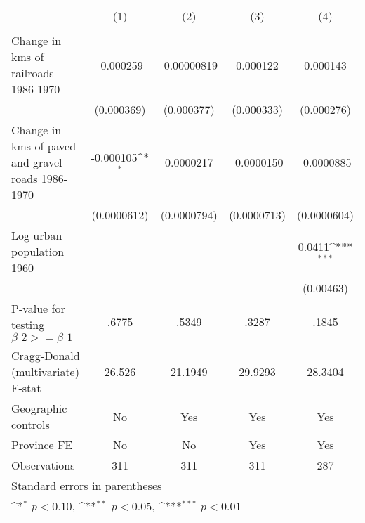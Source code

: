 {
\def\sym#1{\ifmmode^{#1}\else\(^{#1}\)\fi}
\begin{tabular}{l*{4}{c}}
\hline\hline
                &\multicolumn{1}{c}{(1)}&\multicolumn{1}{c}{(2)}&\multicolumn{1}{c}{(3)}&\multicolumn{1}{c}{(4)}\\
                &\multicolumn{1}{c}{}&\multicolumn{1}{c}{}&\multicolumn{1}{c}{}&\multicolumn{1}{c}{}\\
\hline
Change in kms of railroads 1986-1970&-0.000259         &-0.00000819         & 0.000122         & 0.000143         \\
                &(0.000369)         &(0.000377)         &(0.000333)         &(0.000276)         \\
[1em]
Change in kms of paved and gravel roads 1986-1970&-0.000105\sym{*}  &0.0000217         &-0.0000150         &-0.0000885         \\
                &(0.0000612)         &(0.0000794)         &(0.0000713)         &(0.0000604)         \\
[1em]
Log urban population 1960&                  &                  &                  &   0.0411\sym{***}\\
                &                  &                  &                  &(0.00463)         \\
\hline
P-value for testing $\beta\_{2} >= \beta\_{1}$&    .6775         &    .5349         &    .3287         &    .1845         \\
Cragg-Donald (multivariate) F-stat&   26.526         &  21.1949         &  29.9293         &  28.3404         \\
Geographic controls&       No         &      Yes         &      Yes         &      Yes         \\
Province FE     &       No         &       No         &      Yes         &      Yes         \\
Observations    &      311         &      311         &      311         &      287         \\
\hline\hline
\multicolumn{5}{l}{\footnotesize Standard errors in parentheses}\\
\multicolumn{5}{l}{\footnotesize \sym{*} \(p<0.10\), \sym{**} \(p<0.05\), \sym{***} \(p<0.01\)}\\
\end{tabular}
}
